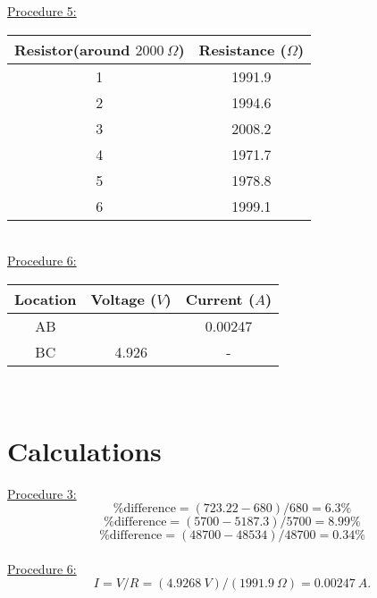 \documentclass[letterpaper, 12pt]{article}
\begin{document}
	
	\noindent \underline{Procedure 5:}\\
	\begin{tabular}{c c}\toprule
		\bf Resistor(around $\SI{2000}{\Omega}$) & \bf Resistance ($\Omega$)\\ \midrule
		1 & 1991.9\\
		2 & 1994.6\\
		3 & 2008.2\\
		4 & 1971.7\\
		5 & 1978.8\\
		6 & 1999.1\\ \bottomrule
	\end{tabular}\\
	
	\noindent \underline{Procedure 6:}\\
	\begin{tabular}{c c c}\toprule
		\bf Location & \bf Voltage ($V$) & \bf Current ($A$) \\ \midrule
		AB & \SI{2e-6} & 0.00247\\
		BC & 4.926 & - \\  \bottomrule
	\end{tabular}\\

	
	\section*{Calculations}
	\underline{Procedure 3:}\\
	\[
	\% \mathrm{difference}=(723.22-680)/680=6.3\%
	\]
	\[
	\% \mathrm{difference}=(5700-5187.3)/5700=8.99\%
	\]
	\[
	\% \mathrm{difference}=(48700-48534)/48700=0.34\%
	\]\\
	
	\noindent \underline{Procedure 6:}
	\[
	I=V/R=(\SI{4.9268}{V})/(\SI{1991.9}{\Omega})=\SI{0.00247}{A}.
	\]\\
	
\end{document}
